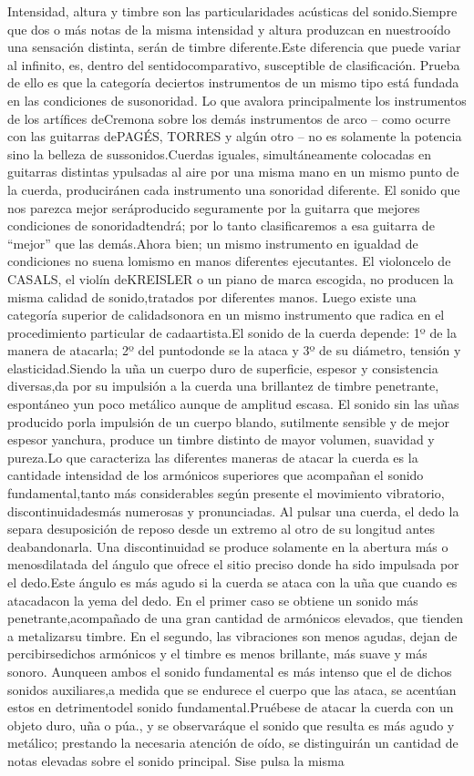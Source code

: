 \documentclass[
11pt, %
a4paper, %
oneside, %
headinclude,footinclude, %
BCOR5mm, %
]{scrartcl}
\begin{document}
{Intensidad, altura y timbre son las particularidades acústicas del sonido.Siempre que dos o más notas de la misma intensidad y altura produzcan en nuestrooído una sensación distinta, serán de timbre diferente.Este diferencia que puede variar al infinito, es, dentro del sentidocomparativo, susceptible de clasificación. Prueba de ello es que la categoría deciertos instrumentos de un mismo tipo está fundada en las condiciones de susonoridad. Lo que avalora principalmente los instrumentos de los artífices deCremona sobre los demás instrumentos de arco – como ocurre con las guitarras dePAGÉS, TORRES y algún otro – no es solamente la potencia sino la belleza de sussonidos.Cuerdas iguales, simultáneamente colocadas en guitarras distintas ypulsadas al aire por una misma mano en un mismo punto de la cuerda, produciránen cada instrumento una sonoridad diferente. El sonido que nos parezca mejor seráproducido seguramente por la guitarra que mejores condiciones de sonoridadtendrá; por lo tanto clasificaremos a esa guitarra de “mejor” que las demás.Ahora bien; un mismo instrumento en igualdad de condiciones no suena lomismo en manos diferentes ejecutantes. El violoncelo de CASALS, el violín deKREISLER o un piano de marca escogida, no producen la misma calidad de sonido,tratados por diferentes manos. Luego existe una categoría superior de calidadsonora en un mismo instrumento que radica en el procedimiento particular de cadaartista.El sonido de la cuerda depende: 1º de la manera de atacarla; 2º del puntodonde se la ataca y 3º de su diámetro, tensión y elasticidad.Siendo la uña un cuerpo duro de superficie, espesor y consistencia diversas,da por su impulsión a la cuerda una brillantez de timbre penetrante, espontáneo yun poco metálico aunque de amplitud escasa. El sonido sin las uñas producido porla impulsión de un cuerpo blando, sutilmente sensible y de mejor espesor yanchura, produce un timbre distinto de mayor volumen, suavidad y pureza.Lo que caracteriza las diferentes maneras de atacar la cuerda es la cantidade intensidad de los armónicos superiores que acompañan el sonido fundamental,tanto más considerables según presente el movimiento vibratorio, discontinuidadesmás numerosas y pronunciadas. Al pulsar una cuerda, el dedo la separa desuposición de reposo desde un extremo al otro de su longitud antes deabandonarla. Una discontinuidad se produce solamente en la abertura más o menosdilatada del ángulo que ofrece el sitio preciso donde ha sido impulsada por el dedo.Este ángulo es más agudo si la cuerda se ataca con la uña que cuando es atacadacon la yema del dedo. En el primer caso se obtiene un sonido más penetrante,acompañado de una gran cantidad de armónicos elevados, que tienden a metalizarsu timbre. En el segundo, las vibraciones son menos agudas, dejan de percibirsedichos armónicos y el timbre es menos brillante, más suave y más sonoro. Aunqueen ambos el sonido fundamental es más intenso que el de dichos sonidos auxiliares,a medida que se endurece el cuerpo que las ataca, se acentúan estos en detrimentodel sonido fundamental.Pruébese de atacar la cuerda con un objeto duro, uña o púa., y se observaráque el sonido que resulta es más agudo y metálico; prestando la necesaria atención de oído, se distinguirán un cantidad de notas elevadas sobre el sonido principal. Sise pulsa la misma }
\end{document}

